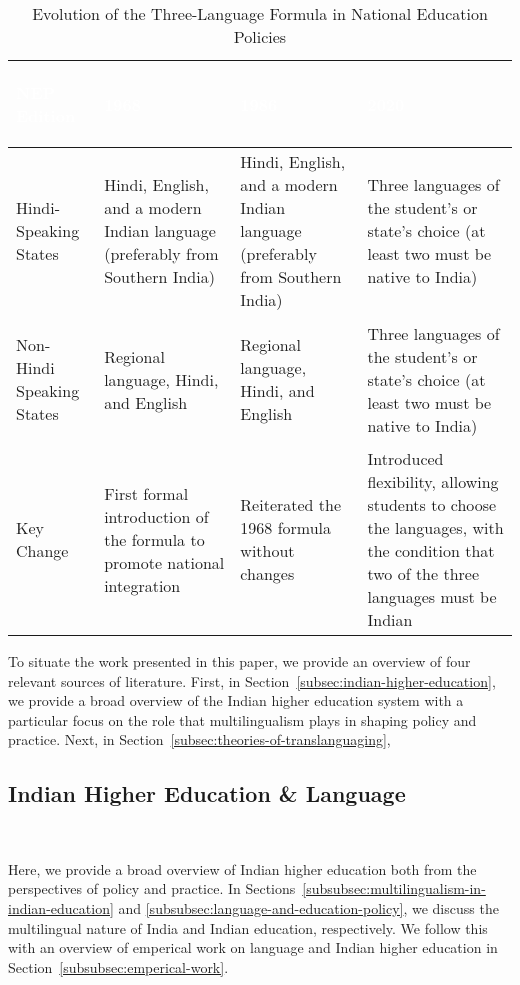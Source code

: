 \begin{table*}[ht]
\centering
\renewcommand{\arraystretch}{1.8}
\begin{tabularx}{\textwidth}{>{\bfseries\raggedright\arraybackslash}X >{\raggedright\arraybackslash}X >{\raggedright\arraybackslash}X >{\raggedright\arraybackslash}X} 
  \hline
\rowcolor{steelblue}
\textcolor{white}{NEP Edition} & \textcolor{white}{\textbf{1968}~\cite{NEP1968}} &
\textcolor{white}{\textbf{1986}~\cite{NEP1986}} &
\textcolor{white}{\textbf{2020}~\cite{NEP2020}} \\ \hline
\rowcolor{palesteelblue}
Hindi-Speaking States & Hindi, English, and a modern Indian language (preferably from Southern India) & Hindi, English, and a modern Indian language (preferably from Southern India) & Three languages of the student's or state's choice (at least two must be native to India) \\
\rowcolor{white}
Non-Hindi Speaking States & Regional language, Hindi, and English & Regional language, Hindi, and English & Three languages of the student's or state's choice (at least two must be native to India) \\
\rowcolor{palesteelblue}
Key Change & First formal introduction of the formula to promote national
integration & Reiterated the 1968 formula without changes & Introduced
flexibility, allowing students to choose the languages, with the condition that
two of the three languages must be Indian \\ \hline
\end{tabularx}
\vspace{0.5em}
\caption{Evolution of the Three-Language Formula in National Education Policies}
\label{tab:three-language-formula}
\end{table*}

To situate the work presented in this paper, we provide an overview of four
relevant sources of literature. First, in
Section~\ref{subsec:indian-higher-education}, we provide a broad overview of the
Indian higher education system with a particular focus on the role that
multilingualism plays in shaping policy and practice. Next, in
Section~\ref{subsec:theories-of-translanguaging},

\subsection{Indian Higher Education \& Language}~\label{subsec:indian-higher-education}

Here, we provide a broad overview of Indian higher education both from the
perspectives of policy and practice. In
Sections~\ref{subsubsec:multilingualism-in-indian-education} and
\ref{subsubsec:language-and-education-policy}, we discuss the multilingual
nature of India and Indian education, respectively. We follow this with an
overview of emperical work on language and Indian higher education in
Section~\ref{subsubsec:emperical-work}.

